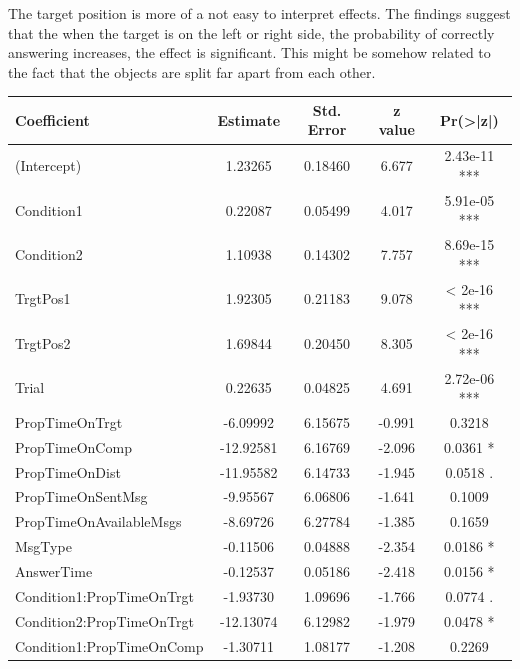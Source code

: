 The target position is more of a not easy to interpret effects. The findings suggest that the when the target is on the left or right side, the probability of correctly answering increases, the effect is significant. This might be somehow related to the fact that the objects are split far apart from each other.

\begin{table}[h!]
\centering
\begin{tabular}{|l|c|c|c|c|}
\hline
\textbf{Coefficient} & \textbf{Estimate} & \textbf{Std. Error} & \textbf{z value} & \textbf{Pr(>|z|)} \\ \hline
(Intercept)                          & 1.23265 & 0.18460 & 6.677 & 2.43e-11 *** \\ \hline
Condition1                           & 0.22087 & 0.05499 & 4.017 & 5.91e-05 *** \\ \hline
Condition2                           & 1.10938 & 0.14302 & 7.757 & 8.69e-15 *** \\ \hline
TrgtPos1                             & 1.92305 & 0.21183 & 9.078 & < 2e-16 *** \\ \hline
TrgtPos2                             & 1.69844 & 0.20450 & 8.305 & < 2e-16 *** \\ \hline
Trial                                & 0.22635 & 0.04825 & 4.691 & 2.72e-06 *** \\ \hline
PropTimeOnTrgt                      & -6.09992 & 6.15675 & -0.991 & 0.3218 \\ \hline
PropTimeOnComp                     & -12.92581 & 6.16769 & -2.096 & 0.0361 * \\ \hline
PropTimeOnDist                     & -11.95582 & 6.14733 & -1.945 & 0.0518 . \\ \hline
PropTimeOnSentMsg                   & -9.95567 & 6.06806 & -1.641 & 0.1009 \\ \hline
PropTimeOnAvailableMsgs             & -8.69726 & 6.27784 & -1.385 & 0.1659 \\ \hline
MsgType                            & -0.11506 & 0.04888 & -2.354 & 0.0186 * \\ \hline
AnswerTime                          & -0.12537 & 0.05186 & -2.418 & 0.0156 * \\ \hline
Condition1:PropTimeOnTrgt           & -1.93730 & 1.09696 & -1.766 & 0.0774 . \\ \hline
Condition2:PropTimeOnTrgt          & -12.13074 & 6.12982 & -1.979 & 0.0478 * \\ \hline
Condition1:PropTimeOnComp           & -1.30711 & 1.08177 & -1.208 & 0.2269 \\ \hline

\end{tabular}
\end{table}

